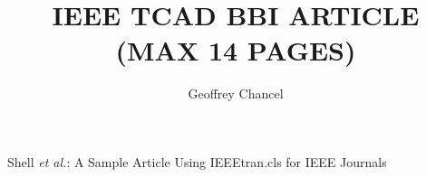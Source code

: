 \documentclass[lettersize,journal]{IEEEtran}
\begin{document}
	\title{IEEE TCAD BBI ARTICLE (MAX 14 PAGES)}
	\author{Geoffrey Chancel}
	{Shell \MakeLowercase{\textit{et al.}}: A Sample Article Using IEEEtran.cls for IEEE Journals}
	\maketitle
	
	
	
	
	
%	
%	
%	
	
\end{document}
